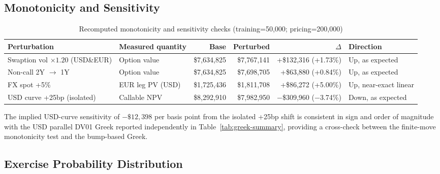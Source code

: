 \documentclass[conference]{IEEEtran}
\begin{document}
\subsection{Monotonicity and Sensitivity}

\begin{table}[!t]
\centering
\begin{tabular}{llrrrl}
\toprule
\textbf{Perturbation} & \textbf{Measured quantity} & \textbf{Base} & \textbf{Perturbed} & \textbf{$\Delta$} & \textbf{Direction} \\
\midrule
Swaption vol $\times1.20$ (USD\&EUR) & Option value & \$7,634,825 & \$7,767,141 & +\$132,316 (+1.73\%) & \textcolor{pass}{Up, as expected} \\
Non-call 2Y $\to$ 1Y & Option value & \$7,634,825 & \$7,698,705 & +\$63,880 (+0.84\%) & \textcolor{pass}{Up, as expected} \\
FX spot +5\% & EUR leg PV (USD) & \$1,725,436 & \$1,811,708 & +\$86,272 (+5.00\%) & \textcolor{pass}{Up, near-exact linear} \\
USD curve +25bp (isolated) & Callable NPV & \$8,292,910 & \$7,982,950 & $-$\$309,960 ($-$3.74\%) & \textcolor{pass}{Down, as expected} \\
\bottomrule
\end{tabular}
\caption{Recomputed monotonicity and sensitivity checks (training=50,000; pricing=200,000)}
\end{table}

The implied USD-curve sensitivity of $-\$12{,}398$ per basis point from the isolated +25bp shift is consistent in sign and order of magnitude with the USD parallel DV01 Greek reported independently in Table~\ref{tab:greek-summary}, providing a cross-check between the finite-move monotonicity test and the bump-based Greek.

\subsection{Exercise Probability Distribution}
\end{document}
